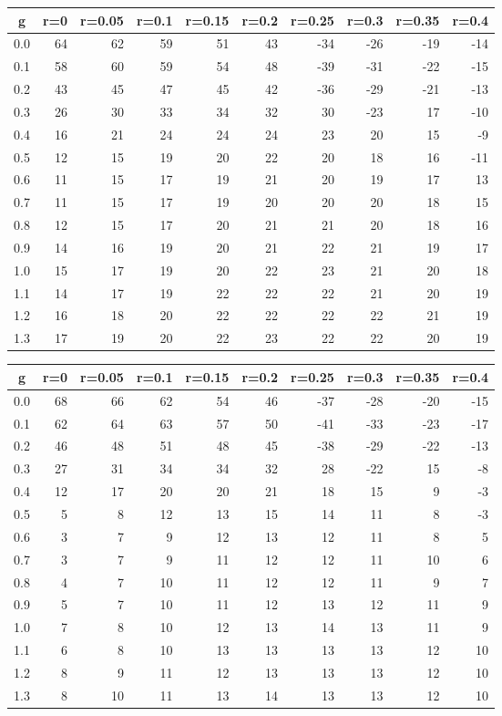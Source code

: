 %
\begin{table}[!tbp]
 \begin{center}
 \begin{tabular}{rrrrrrrrrr}\hline\hline
\multicolumn{1}{c}{g}&\multicolumn{1}{c}{r=0}&\multicolumn{1}{c}{r=0.05}&\multicolumn{1}{c}{r=0.1}&\multicolumn{1}{c}{r=0.15}&\multicolumn{1}{c}{r=0.2}&\multicolumn{1}{c}{r=0.25}&\multicolumn{1}{c}{r=0.3}&\multicolumn{1}{c}{r=0.35}&\multicolumn{1}{c}{r=0.4}\tabularnewline
\hline
0.0&64&62&59&51&43&-34&-26&-19&-14\tabularnewline
0.1&58&60&59&54&48&-39&-31&-22&-15\tabularnewline
0.2&43&45&47&45&42&-36&-29&-21&-13\tabularnewline
0.3&26&30&33&34&32& 30&-23& 17&-10\tabularnewline
0.4&16&21&24&24&24& 23& 20& 15& -9\tabularnewline
0.5&12&15&19&20&22& 20& 18& 16&-11\tabularnewline
0.6&11&15&17&19&21& 20& 19& 17& 13\tabularnewline
0.7&11&15&17&19&20& 20& 20& 18& 15\tabularnewline
0.8&12&15&17&20&21& 21& 20& 18& 16\tabularnewline
0.9&14&16&19&20&21& 22& 21& 19& 17\tabularnewline
1.0&15&17&19&20&22& 23& 21& 20& 18\tabularnewline
1.1&14&17&19&22&22& 22& 21& 20& 19\tabularnewline
1.2&16&18&20&22&22& 22& 22& 21& 19\tabularnewline
1.3&17&19&20&22&23& 22& 22& 20& 19\tabularnewline
\hline
\end{tabular}

\end{center}

\end{table}

%
\begin{table}[!tbp]
 \begin{center}
 \begin{tabular}{rrrrrrrrrr}\hline\hline
\multicolumn{1}{c}{g}&\multicolumn{1}{c}{r=0}&\multicolumn{1}{c}{r=0.05}&\multicolumn{1}{c}{r=0.1}&\multicolumn{1}{c}{r=0.15}&\multicolumn{1}{c}{r=0.2}&\multicolumn{1}{c}{r=0.25}&\multicolumn{1}{c}{r=0.3}&\multicolumn{1}{c}{r=0.35}&\multicolumn{1}{c}{r=0.4}\tabularnewline
\hline
0.0&68&66&62&54&46&-37&-28&-20&-15\tabularnewline
0.1&62&64&63&57&50&-41&-33&-23&-17\tabularnewline
0.2&46&48&51&48&45&-38&-29&-22&-13\tabularnewline
0.3&27&31&34&34&32& 28&-22& 15& -8\tabularnewline
0.4&12&17&20&20&21& 18& 15&  9& -3\tabularnewline
0.5& 5& 8&12&13&15& 14& 11&  8& -3\tabularnewline
0.6& 3& 7& 9&12&13& 12& 11&  8&  5\tabularnewline
0.7& 3& 7& 9&11&12& 12& 11& 10&  6\tabularnewline
0.8& 4& 7&10&11&12& 12& 11&  9&  7\tabularnewline
0.9& 5& 7&10&11&12& 13& 12& 11&  9\tabularnewline
1.0& 7& 8&10&12&13& 14& 13& 11&  9\tabularnewline
1.1& 6& 8&10&13&13& 13& 13& 12& 10\tabularnewline
1.2& 8& 9&11&12&13& 13& 13& 12& 10\tabularnewline
1.3& 8&10&11&13&14& 13& 13& 12& 10\tabularnewline
\hline
\end{tabular}

\end{center}

\end{table}

